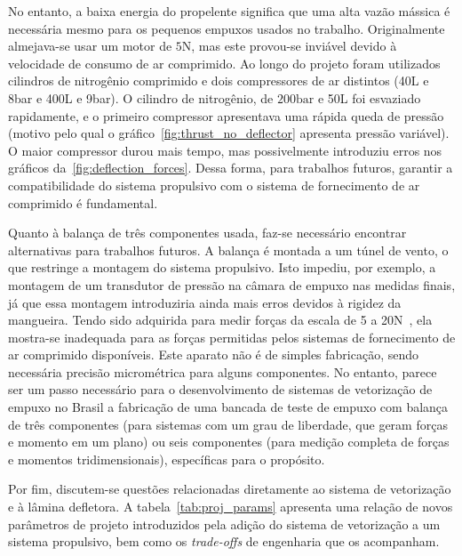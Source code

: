 No entanto, a baixa energia do propelente significa que uma alta vazão mássica é necessária mesmo para os pequenos empuxos usados no trabalho. Originalmente almejava-se usar um motor de \(5\mathrm{N}\), mas este provou-se inviável devido à velocidade de consumo de ar comprimido. Ao longo do projeto foram utilizados cilindros de nitrogênio comprimido e dois compressores de ar distintos (40L e 8bar e 400L e 9bar). O cilindro de nitrogênio, de \(200\mathrm{bar}\) e 50L foi esvaziado rapidamente, e o primeiro compressor apresentava uma rápida queda de pressão (motivo pelo qual o gráfico~\ref{fig:thrust_no_deflector} apresenta pressão variável). O maior compressor durou mais tempo, mas possivelmente introduziu erros nos gráficos da~\ref{fig:deflection_forces}. Dessa forma, para trabalhos futuros, garantir a compatibilidade do sistema propulsivo com o sistema de fornecimento de ar comprimido é fundamental.\ 

Quanto à balança de três componentes usada, faz-se necessário encontrar alternativas para trabalhos futuros. A balança é montada a um túnel de vento, o que restringe a montagem do sistema propulsivo. Isto impediu, por exemplo, a montagem de um transdutor de pressão na câmara de empuxo nas medidas finais, já que essa montagem introduziria ainda mais erros devidos à rigidez da mangueira. Tendo sido adquirida para medir forças da escala de 5 a 20N~\cite{lab}, ela mostra-se inadequada para as forças permitidas pelos sistemas de fornecimento de ar comprimido disponíveis. Este aparato não é de simples fabricação, sendo necessária precisão micrométrica para alguns componentes. No entanto, parece ser um passo necessário para o desenvolvimento de sistemas de vetorização de empuxo no Brasil a fabricação de uma bancada de teste de empuxo com balança de três componentes (para sistemas com um grau de liberdade, que geram forças e momento em um plano) ou seis componentes (para medição completa de forças e momentos tridimensionais), específicas para o propósito.\

Por fim, discutem-se questões relacionadas diretamente ao sistema de vetorização e à lâmina defletora. A tabela~\ref{tab:proj_params} apresenta uma relação de novos parâmetros de projeto introduzidos pela adição do sistema de vetorização a um sistema propulsivo, bem como os \textit{trade-offs} de engenharia que os acompanham.

